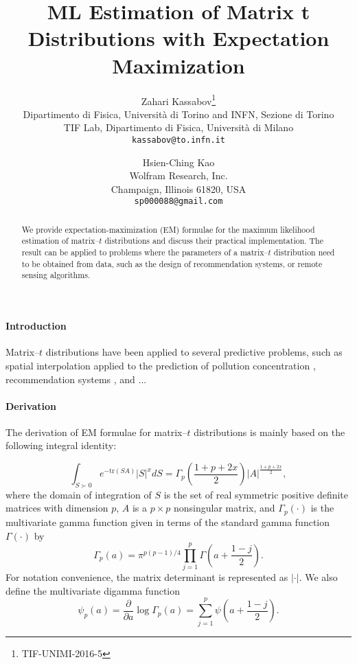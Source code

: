 \documentclass[english,listof=totoc]{scrartcl}
\title{ML Estimation of Matrix t Distributions with Expectation Maximization}
\author{Zahari Kassabov\thanks{TIF-UNIMI-2016-5}\\
        Dipartimento di Fisica, Universit\`a di Torino and INFN, Sezione di Torino\\
		TIF Lab, Dipartimento di Fisica, Universit\`a di Milano\\
        \texttt{kassabov@to.infn.it}\\
        \and
        Hsien-Ching Kao\\
        Wolfram Research, Inc.\\
		Champaign, Illinois 61820, USA\\
		\texttt{sp000088@gmail.com}
		}
\begin{document}
\maketitle

\begin{abstract}
We provide expectation-maximization (EM) formulae for the maximum
likelihood estimation of matrix--$t$ distributions and discuss their
practical implementation.  The result can be applied to problems where
the parameters of a matrix--$t$ distribution need to be obtained from
data, such as the design of recommendation systems, or remote sensing
algorithms.
\end{abstract}

\paragraph{Introduction}
Matrix--$t$ distributions have been applied to several predictive problems, such as spatial interpolation applied to the prediction of pollution concentration \cite{}, recommendation systems \cite{NIPS2007_3203}, and
...

\paragraph{Derivation}

The derivation of EM formulae for matrix--$t$ distributions is mainly based on the following integral identity:

\begin{equation}
\int_{S\succ 0}e^{-\textrm{tr}(SA)}|S|^{x}dS=\Gamma_{p}\left(\frac{1+p+2x}{2}\right)|A|^{\frac{1+p+2x}{2}},\label{eq:intmultgammadef}
\end{equation}
where the domain of integration of $S$ is the set of real symmetric positive definite
matrices with dimension $p$, $A$ is a $p\times p$ nonsingular matrix, and $\Gamma_{p}(\cdot)$ is the multivariate gamma function given in terms of the standard gamma function $\Gamma(\cdot)$ by
\begin{equation}
\Gamma_{p}(a)=\pi^{p(p-1)/4}\prod_{j=1}^{p}\Gamma\left(a+\frac{1-j}{2}\right).\label{eq:multgammadef}
\end{equation}
For notation convenience, the matrix determinant is represented as $|\cdot|$. We also define the multivariate digamma function
\begin{equation}
\psi_{p}(a)=\frac{\partial}{\partial a}\log\Gamma_{p}(a)=\sum_{j=1}^{p}\psi\left(a+\frac{1-j}{2}\right).
\end{equation}
\end{document}
